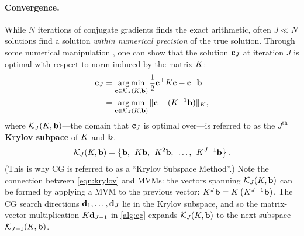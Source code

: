 

\paragraph{Convergence.}
While $N$ iterations of conjugate gradients finds the exact arithmetic, often $J \ll N$ solutions find a solution \emph{within numerical precision} of the true solution.
Through some numerical manipulation \citep[][Ch. 9]{shewchuk1994introduction}, one can show that the solution $\mathbf{c}_J$ at iteration $J$ is optimal with respect to norm induced by the matrix $K$:
%
\begin{align}
  \mathbf{c}_J
  &= \operatorname*{arg\,min}_{\mathbf{c} \in \mathcal{K}_J (K, \mathbf{b})} \frac{1}{2} \mathbf{c}^\top K \mathbf{c} - \mathbf{c}^\top \mathbf{b}
  \nonumber \\
  &= \operatorname*{arg\,min}_{\mathbf{c} \in \mathcal{K}_J (K, \mathbf{b})} \Vert \mathbf{c} - (K^{-1} \mathbf{b}) \Vert_{K},
  \label{eqn:cg_optimality}
\end{align}
%
where $\mathcal{K}_J (K, \mathbf{b})$---the domain that $\mathbf{c}_J$ is optimal over---is referred to as the $J^\text{th}$ {\bf Krylov subpace} of $K$ and $\mathbf{b}$.
%
\begin{equation}
  \mathcal{K}_J (K, \mathbf{b}) = \left\{ \mathbf{b}, \:\: K \mathbf{b}, \:\: K^2 \mathbf{b}, \:\: \ldots, \:\: K^{J-1} \mathbf{b} \right\}.
  \label{eqn:krylov}
\end{equation}
%
(This is why CG is referred to as a ``Krylov Subspace Method''.)
Note the connection between \cref{eqn:krylov} and MVMs:
the vectors spanning $\mathcal{K}_J (K, \mathbf{b})$ can be formed by applying a MVM to the previous vector: $K^J \mathbf{b} = K \left( K^{J-1} \mathbf{b} \right)$.
The CG search directions $\mathbf{d}_1, \ldots, \mathbf{d}_J$ lie in the Krylov subspace, and so the matrix-vector multiplication $K \mathbf{d}_{J-1}$ in \cref{alg:cg} expands $\mathcal{K}_{J}(K, \mathbf{b})$ to the next subspace $\mathcal{K}_{J+1} (K, \mathbf{b})$.

